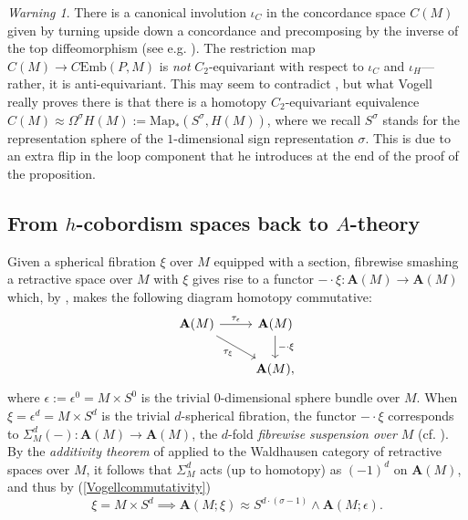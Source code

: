 \documentclass[a4paper, oneside]{amsart}
\newcommand{\diff}{\mathrm{Diff}}
\newcommand{\cemb}{C\mathrm{Emb}}
\newcommand{\1}{\mathds{1}}
\theoremstyle{remark}
\newtheorem{warn}[thm]{Warning}
\theoremstyle{definition}
\newcommand{\Asp}{\mathbf{A}}
\newcommand{\Whsp}{\mathbf{Wh}^{\diff}}
\numberwithin{equation}{section}
\begin{document}
\begin{warn}\label{vogellwarning}
    There is a canonical involution $\iota_C$ in the concordance space $C(M)$ given by turning upside down a concordance and precomposing by the inverse of the top diffeomorphism (see e.g. \cite[p. 296]{VogellInvolution}). The restriction map $C(M)\to \cemb(P,M)$ is \emph{not} $C_2$-equivariant with respect to $\iota_C$ and $\iota_H$---rather, it is anti-equivariant. This may seem to contradict \cite[Prop. 2.2]{VogellInvolution}, but what Vogell really proves there is that there is a homotopy $C_2$-equivariant equivalence $C(M)\approx \Omega^\sigma H(M):=\mathrm{Map}_*(S^\sigma, H(M))$, where we recall $S^\sigma$ stands for the representation sphere of the $1$-dimensional sign representation $\sigma$. This is due to an extra flip in the loop component that he introduces at the end of the proof of the proposition. 
\end{warn}




\subsection{From $h$-cobordism spaces back to $A$-theory}\label{Vogellinvsection} %

Given a spherical fibration $\xi$ over $M$ equipped with a section, fibrewise smashing a retractive space over $M$ with $\xi$ gives rise to a functor $-\cdot \xi: \Asp(M)\to \Asp(M)$ which, by \cite[Prop. 2.5]{VogellInvolution}, makes the following diagram homotopy commutative:
\begin{equation}\label{Vogellcommutativity}
\begin{tikzcd}
\Asp(M)\rar["\tau_{\epsilon}"]\ar[dr, "\tau_\xi"'] & \Asp(M)\dar["-\cdot \xi"]\\
&\Asp(M),
\end{tikzcd}
\end{equation}
where $\epsilon:=\epsilon^0=M\times S^0$ is the trivial $0$-dimensional sphere bundle over $M$. When $\xi=\epsilon^d=M\times S^d$ is the trivial $d$-spherical fibration, the functor $-\cdot \xi$ corresponds to $\Sigma^d_M(-): \Asp(M)\to \Asp(M)$, the $d$-fold \textit{fibrewise suspension over $M$} (cf. \cite[p. 281]{VogellInvolution}). By the \textit{additivity theorem} of \cite[Prop. 1.6.2]{WaldhausenAtheory} applied to the Waldhausen category of retractive spaces over $M$, it follows that $\Sigma^d_M$ acts (up to homotopy) as $(-1)^d$ on $\Asp(M)$, and thus by (\ref{Vogellcommutativity})
\begin{equation}\label{Vogellinvtrivbundle}
\xi=M\times S^d\implies \Asp(M;\xi)\approx S^{d\cdot(\sigma-1)}\wedge \Asp(M;\epsilon).
\end{equation}
\end{document}
